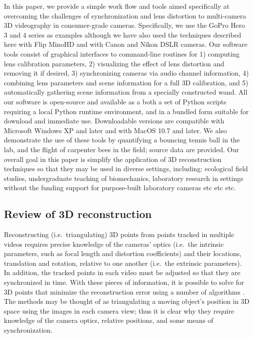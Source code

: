 \documentclass[fleqn,10pt]{wlpeerj}
\begin{document}
In this paper, we provide a simple work flow and tools aimed specifically at overcoming the challenges of synchronization and lens distortion to multi-camera 3D videography in consumer-grade cameras. Specifically, we use the GoPro Hero 3 and 4 series as examples although we have also used the techniques described here with Flip MinoHD and with Canon and Nikon DSLR cameras.  Our software tools consist of graphical interfaces to command-line routines for 1) computing lens calibration parameters, 2) visualizing the effect of lens distortion and removing it if desired, 3) synchronizing cameras via audio channel information, 4) combining lens parameters and scene information for a full 3D calibration, and 5) automatically gathering scene information from a specially constructed wand. All our software is open-source and available as a both a set of Python scripts requiring a local Python runtime environment, and in a bundled form suitable for download and immediate use. Downloadable versions are compatible with Microsoft Windows XP and later and with MacOS 10.7 and later. We also demonstrate the use of these tools by quantifying a bouncing tennis ball in the lab, and the flight of carpenter bees in the field; source data are provided. Our overall goal in this paper is simplify the application of 3D reconstruction techniques so that they may be used in diverse settings, including: ecological field studies, undergraduate teaching of biomechanics, laboratory research in settings without the funding support for purpose-built laboratory cameras etc etc etc. 

\subsection*{Review of 3D reconstruction}

Reconstructing (i.e.~triangulating) 3D points from points tracked in multiple videos requires precise knowledge of the cameras' optics (i.e.~the intrinsic parameters, such as focal length and distortion coefficients) and their locations, translation and rotation, relative to one another (i.e.~the extrinsic parameters).  In addition, the tracked points in each video must be adjusted so that they are synchronized in time.  With these pieces of information, it is possible to solve for 3D points that minimize the reconstruction error using a number of algorithms \citep{Hedrick2008, bouguet2004camera,lour09,HartleyZisserman2000}.  The methods may be thought of as triangulating a moving object's position in 3D space using the images in each camera view; thus it is clear why they require knowledge of the camera optics, relative positions, and some means of synchronization.    
\end{document}
